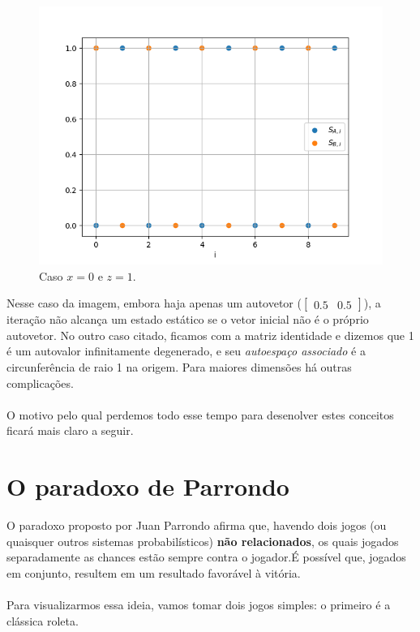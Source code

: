 \documentclass[12pt]{article}
\begin{document}
\begin{figure}[H]
\centering
\includegraphics[scale=0.6]{graph3.png}
\caption{Caso $x = 0$ e $z = 1$.}
\end{figure}

Nesse caso da imagem, embora haja apenas um autovetor ($\begin{bmatrix} 0.5 & 0.5 \end{bmatrix}$), a iteração não alcança um estado estático se o vetor inicial não é o próprio autovetor. No outro caso citado, ficamos com a matriz identidade e dizemos que 1 é um autovalor infinitamente degenerado, e seu \textit{autoespaço associado} é a circunferência de raio 1 na origem. Para maiores dimensões há outras complicações.\\
\\
O motivo pelo qual perdemos todo esse tempo para desenolver estes conceitos ficará mais claro a seguir.

\section{O paradoxo de Parrondo}

O paradoxo proposto por Juan Parrondo afirma que, havendo dois jogos (ou quaisquer outros sistemas probabilísticos) \textbf{não relacionados}, os quais jogados separadamente as chances estão sempre contra o jogador.É possível que, jogados em conjunto, resultem em um resultado favorável à vitória.\\
\\
Para visualizarmos essa ideia, vamos tomar dois jogos simples: o primeiro é a clássica roleta.
\end{document}
